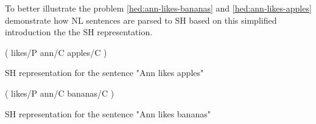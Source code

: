 \documentclass[11pt]{scrreprt}
\begin{document}



To better illustrate the problem \cref{hed:ann-likes-bananas} and \cref{hed:ann-likes-apples} demonstrate how NL sentences are parsed to SH based on this simplified introduction the the SH representation.

\begin{hedge}
  \normalfont\sffamily
  \centering
  ( likes/P ann/C apples/C ) 
  \caption{SH representation for the sentence "Ann likes apples"}
  \label{hed:ann-likes-apples}
\end{hedge}

\begin{hedge}
  \normalfont\sffamily
  \centering
  ( likes/P ann/C bananas/C ) 
  \caption{SH representation for the sentence "Ann likes bananas"}
  \label{hed:ann-likes-bananas}
\end{hedge}
\end{document}
